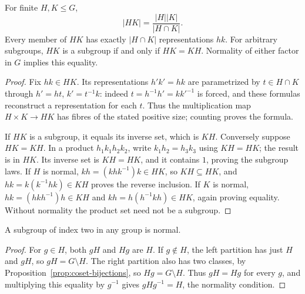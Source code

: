 \begin{proposition}\label{prop:subgroup-product}
For finite $H,K\leq G$,
\[
 |HK|=\frac{|H||K|}{|H\cap K|}.
\]
Every member of $HK$ has exactly $|H\cap K|$ representations $hk$. For arbitrary subgroups, $HK$ is a subgroup if and only if $HK=KH$. Normality of either factor in $G$ implies this equality.
\end{proposition}
\begin{proof}
Fix $hk\in HK$. Its representations $h'k'=hk$ are parametrized by $t\in H\cap K$ through $h'=ht$, $k'=t^{-1}k$: indeed $t=h^{-1}h'=kk'^{-1}$ is forced, and these formulas reconstruct a representation for each $t$. Thus the multiplication map $H\times K\to HK$ has fibres of the stated positive size; counting proves the formula.

If $HK$ is a subgroup, it equals its inverse set, which is $KH$. Conversely suppose $HK=KH$. In a product $h_1k_1h_2k_2$, write $k_1h_2=h_3k_3$ using $KH=HK$; the result is in $HK$. Its inverse set is $KH=HK$, and it contains $1$, proving the subgroup laws. If $H$ is normal, $kh=(khk^{-1})k\in HK$, so $KH\subseteq HK$, and $hk=k(k^{-1}hk)\in KH$ proves the reverse inclusion. If $K$ is normal, $hk=(hkh^{-1})h\in KH$ and $kh=h(h^{-1}kh)\in HK$, again proving equality. Without normality the product set need not be a subgroup.
\end{proof}

\begin{lemma}\label{lem:index-two-preliminary}
A subgroup of index two in any group is normal.
\end{lemma}
\begin{proof}
For $g\in H$, both $gH$ and $Hg$ are $H$. If $g\notin H$, the left partition has just $H$ and $gH$, so $gH=G\setminus H$. The right partition also has two classes, by Proposition~\ref{prop:coset-bijections}, so $Hg=G\setminus H$. Thus $gH=Hg$ for every $g$, and multiplying this equality by $g^{-1}$ gives $gHg^{-1}=H$, the normality condition.
\end{proof}


